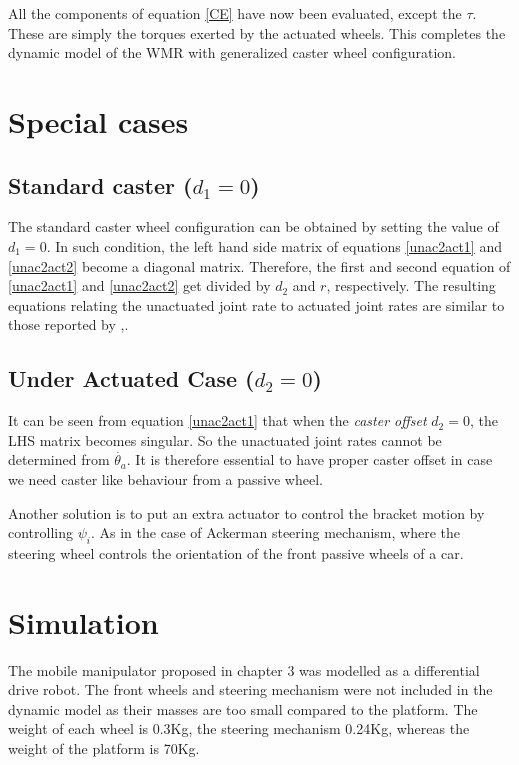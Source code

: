 All the components of  equation  \ref{CE}  have now been evaluated, except the $\tau$. These are simply the torques exerted by the actuated wheels. This completes the dynamic model of the WMR with generalized caster wheel configuration.








\section{Special cases}
\subsection{Standard caster ($d_1=0$) }
The  standard caster wheel configuration can be obtained by setting the value of $d_1=0$. In such condition, the left hand side matrix of  equations \ref{unac2act1} and \ref{unac2act2} become  a diagonal matrix. Therefore, the first and second equation of \ref{unac2act1} and \ref{unac2act2} get divided by $d_2$ and $r$, respectively. The resulting  equations relating the unactuated joint rate to  actuated joint rates are similar to those reported by \cite{saha1991dynamics},\cite{angeles2013fundamentals}.
\subsection{Under Actuated Case ($d_2=0$)}
It can be seen from equation \ref{unac2act1} that when the \textit{caster offset} $d_2=0$, the LHS matrix becomes singular. So the unactuated joint rates cannot be determined from $\dot{\theta_a}$. It is therefore essential to have proper caster offset in case we need caster like behaviour from a passive wheel. 

Another solution is to put an extra actuator to control the bracket motion by controlling $\psi_i$. As in the case of Ackerman steering mechanism, where the steering wheel controls the orientation of the front passive wheels of a car.

\section{Simulation }
 
The mobile manipulator proposed in chapter 3  was modelled as a differential drive robot. The front wheels and steering mechanism were not included in the dynamic model as their masses are too small compared to the  platform. The weight of each wheel is 0.3Kg, the steering mechanism 0.24Kg, whereas the weight of the  platform is 70Kg.

